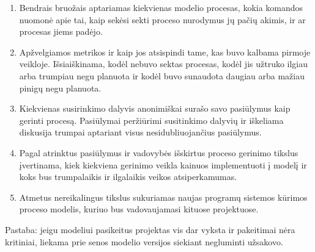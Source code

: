 \documentclass{VUMIFPSkursinis}
\begin{document}
	\begin{enumerate}
		\item{Bendrais bruožais aptariamas kiekvienas modelio procesas, kokia komandos nuomonė apie tai, kaip sekėsi sekti proceso nurodymus jų pačių akimis, ir ar procesas jiems padėjo.}
		\item{Apžvelgiamos metrikos ir kaip jos atsispindi tame, kas buvo kalbama pirmoje veikloje. 
			Išsiaiškinama, kodėl nebuvo sektas procesas, kodėl jis užtruko ilgiau arba trumpiau negu planuota ir kodėl buvo sunaudota daugiau arba mažiau pinigų negu planuota.}
		\item{Kiekvienas susirinkimo dalyvis anonimiškai surašo savo pasiūlymus kaip gerinti procesą.
			Pasiūlymai peržiūrimi susitinkimo dalyvių ir iškeliama diskusija trumpai aptariant visus nesidubliuojančius pasiūlymus.}
		\item{Pagal atrinktus pasiūlymus ir vadovybės išskirtus proceso gerinimo tikslus įvertinama, kiek kiekviena gerinimo veikla kainuos implementuoti į modelį ir koks bus trumpalaikis ir ilgalaikis veikos atsiperkamumas.}
		\item{Atmetus nereikalingus tikslus sukuriamas naujas programų sistemos kūrimos proceso modelis, kuriuo bus vadovaujamasi kituose projektuose.}
	\end{enumerate}

	Pastaba: jeigu modeliui pasikeitus projektas vis dar vyksta ir pakeitimai nėra kritiniai, liekama prie senos modelio versijos siekiant negluminti užsakovo.	
\end{document}
